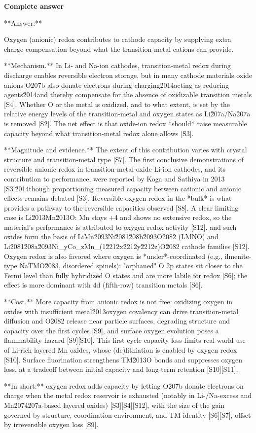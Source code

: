 \documentclass[10pt]{article}
\begin{document}
\textbf{Complete answer}
\begin{AnswerText}
**Answer:**

Oxygen (anionic) redox contributes to cathode capacity by supplying extra charge compensation beyond what the transition-metal cations can provide.

**Mechanism.** In Li- and Na-ion cathodes, transition-metal redox during discharge enables reversible electron storage, but in many cathode materials oxide anions O\u207b also donate electrons during charging\u2014acting as reducing agents\u2014and thereby compensate for the absence of oxidizable transition metals [S4]. Whether O or the metal is oxidized, and to what extent, is set by the relative energy levels of the transition-metal and oxygen states as Li\u207a/Na\u207a is removed [S2]. The net effect is that oxide-ion redox *should* raise measurable capacity beyond what transition-metal redox alone allows [S3].

**Magnitude and evidence.** The extent of this contribution varies with crystal structure and transition-metal type [S7]. The first conclusive demonstrations of reversible anionic redox in transition-metal-oxide Li-ion cathodes, and its contribution to performance, were reported by Koga and Sathiya in 2013 [S3]\u2014though proportioning measured capacity between cationic and anionic effects remains debated [S3]. Reversible oxygen redox in the *bulk* is what provides a pathway to the reversible capacities observed [S8]. A clear limiting case is Li\u2013Mn\u2013O: Mn stays +4 and shows no extensive redox, so the material's performance is attributed to oxygen redox activity [S12], and such oxides form the basis of LiMn\u2093Ni\u2081\u208b\u2093O\u2082 (LMNO) and Li\u2081\u208a\u2093Ni_yCo_zMn_(1\u2212x\u2212y\u2212z)O\u2082 cathode families [S12]. Oxygen redox is also favored where oxygen is *under*-coordinated (e.g., ilmenite-type NaTMO\u2083, disordered spinels): "orphaned" O 2p states sit closer to the Fermi level than fully hybridized O states and are more labile for redox [S6]; the effect is more dominant with 4d (fifth-row) transition metals [S6].

**Cost.** More capacity from anionic redox is not free: oxidizing oxygen in oxides with insufficient metal\u2013oxygen covalency can drive transition-metal diffusion and O\u2082 release near particle surfaces, degrading structure and capacity over the first cycles [S9], and surface oxygen evolution poses a flammability hazard [S9][S10]. This first-cycle capacity loss limits real-world use of Li-rich layered Mn oxides, whose (de)lithiation is enabled by oxygen redox [S10]. Surface fluorination strengthens TM\u2013O bonds and suppresses oxygen loss, at a tradeoff between initial capacity and long-term retention [S10][S11].

**In short:** oxygen redox adds capacity by letting O\u207b donate electrons on charge when the metal redox reservoir is exhausted (notably in Li-/Na-excess and Mn\u2074\u207a-based layered oxides) [S3][S4][S12], with the size of the gain governed by structure, coordination environment, and TM identity [S6][S7], offset by irreversible oxygen loss [S9].
\end{AnswerText}
\end{document}
